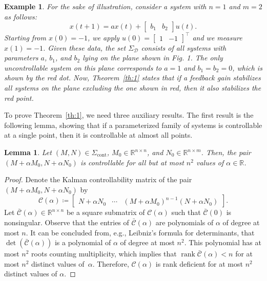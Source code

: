 \documentclass[10pt,a4paper]{amsart}
\DeclareMathOperator{\rank}{rank}
\newtheorem{lemma}[theorem]{Lemma}
\newtheorem{example}[theorem]{Example}
\begin{document}
\begin{example}
\label{ex:2}
For the sake of illustration, consider a system with $n=1$ and $m=2$ as follows:
\begin{equation}
x(t+1)=ax(t)+\begin{bmatrix}
b_1 & b_2
\end{bmatrix}u(t).
\end{equation}
Starting from $x(0)=-1$, we apply $u(0)=\begin{bmatrix}
1 & -1
\end{bmatrix}^\top$ and we measure $x(1)=-1$. Given these data, the set $\Sigma_\mathcal{D}$ consists of all systems with parameters $a$, $b_1$, and $b_2$ lying on the plane shown in Fig. 1. The only uncontrollable system on this plane corresponds to $a=1$ and $b_1=b_2=0$, which is shown by the red dot. Now, Theorem~\ref{th:1} states that if a feedback gain stabilizes all systems on the plane excluding the one shown in red, then it also stabilizes the red point. 
\end{example}



To prove Theorem~\ref{th:1}, we need three auxiliary results. The first result is the following lemma, showing that if a parameterized family of systems is controllable at a single point, then it is controllable at almost all points. 

\begin{lemma}
\label{lem:cont_direct}
Let $(M,N)\in\Sigma_{\text{cont}}$, $M_0\in\mathbb{R}^{n\times n}$, and $N_0\in\mathbb{R}^{n\times m}$. Then, the pair $(M+\alpha M_0,N+\alpha N_0)$ is controllable for all but at most $n^2$ values of $\alpha\in\mathbb{R}$.

\end{lemma}
\begin{proof}
Denote the Kalman controllability matrix of the pair $(M+\alpha M_0,N+\alpha N_0)$ by
\begin{equation}
\mathcal{C}(\alpha)\coloneqq\begin{bmatrix}
N+\alpha N_0 & \cdots & (M+\alpha M_0)^{n-1}(N+\alpha N_0)
\end{bmatrix}.
\end{equation}
Let $\bar{\mathcal{C}}(\alpha)\in\mathbb{R}^{n\times n}$ be a square submatrix of $\mathcal{C}(\alpha)$ such that $\bar{\mathcal{C}}(0)$ is nonsingular. Observe that the entries of $\bar{\mathcal{C}}(\alpha)$ are polynomials of $\alpha$ of degree at most $n$. It can be concluded from, e.g., Leibniz's formula for determinants, that $\det(\bar{\mathcal{C}}(\alpha))$ is a polynomial of $\alpha$ of degree at most $n^2$. This polynomial has at most $n^2$ roots counting multiplicity, which implies that $\rank \bar{\mathcal{C}}(\alpha)<n$ for at most $n^2$ distinct values \mbox{of $\alpha$}. Therefore, $\mathcal{C}(\alpha)$ is rank deficient for at most $n^2$ distinct values of $\alpha$.
\end{proof}
\end{document}
